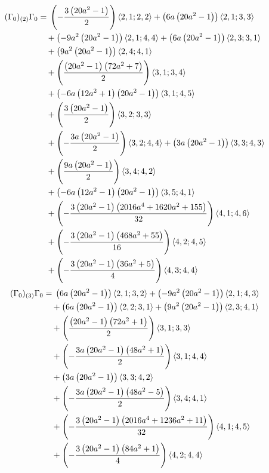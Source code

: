 \begin{align*}
(\Gamma_0)_{(2)}\Gamma_0 &={} \left(- \frac{3 \left(20 a^{2} - 1\right)}{2}\right)\langle 2,1;2,2\rangle + \left(6 a \left(20 a^{2} - 1\right)\right)\langle 2,1;3,3\rangle\\
&\quad {}+ \left(- 9 a^{2} \left(20 a^{2} - 1\right)\right)\langle 2,1;4,4\rangle + \left(6 a \left(20 a^{2} - 1\right)\right)\langle 2,3;3,1\rangle\\
&\quad {}+ \left(9 a^{2} \left(20 a^{2} - 1\right)\right)\langle 2,4;4,1\rangle\\
&\quad {}+ \left(\frac{\left(20 a^{2} - 1\right) \left(72 a^{2} + 7\right)}{2}\right)\langle 3,1;3,4\rangle\\
&\quad {}+ \left(- 6 a \left(12 a^{2} + 1\right) \left(20 a^{2} - 1\right)\right)\langle 3,1;4,5\rangle\\
&\quad {}+ \left(\frac{3 \left(20 a^{2} - 1\right)}{2}\right)\langle 3,2;3,3\rangle\\
&\quad {}+ \left(- \frac{3 a \left(20 a^{2} - 1\right)}{2}\right)\langle 3,2;4,4\rangle + \left(3 a \left(20 a^{2} - 1\right)\right)\langle 3,3;4,3\rangle\\
&\quad {}+ \left(\frac{9 a \left(20 a^{2} - 1\right)}{2}\right)\langle 3,4;4,2\rangle\\
&\quad {}+ \left(- 6 a \left(12 a^{2} - 1\right) \left(20 a^{2} - 1\right)\right)\langle 3,5;4,1\rangle\\
&\quad {}+ \left(- \frac{3 \left(20 a^{2} - 1\right) \left(2016 a^{4} + 1620 a^{2} + 155\right)}{32}\right)\langle 4,1;4,6\rangle\\
&\quad {}+ \left(- \frac{3 \left(20 a^{2} - 1\right) \left(468 a^{2} + 55\right)}{16}\right)\langle 4,2;4,5\rangle\\
&\quad {}+ \left(- \frac{3 \left(20 a^{2} - 1\right) \left(36 a^{2} + 5\right)}{4}\right)\langle 4,3;4,4\rangle
\end{align*}
\begin{align*}
(\Gamma_0)_{(3)}\Gamma_0 &={} \left(6 a \left(20 a^{2} - 1\right)\right)\langle 2,1;3,2\rangle + \left(- 9 a^{2} \left(20 a^{2} - 1\right)\right)\langle 2,1;4,3\rangle\\
&\quad {}+ \left(6 a \left(20 a^{2} - 1\right)\right)\langle 2,2;3,1\rangle + \left(9 a^{2} \left(20 a^{2} - 1\right)\right)\langle 2,3;4,1\rangle\\
&\quad {}+ \left(\frac{\left(20 a^{2} - 1\right) \left(72 a^{2} + 1\right)}{2}\right)\langle 3,1;3,3\rangle\\
&\quad {}+ \left(- \frac{3 a \left(20 a^{2} - 1\right) \left(48 a^{2} + 1\right)}{2}\right)\langle 3,1;4,4\rangle\\
&\quad {}+ \left(3 a \left(20 a^{2} - 1\right)\right)\langle 3,3;4,2\rangle\\
&\quad {}+ \left(- \frac{3 a \left(20 a^{2} - 1\right) \left(48 a^{2} - 5\right)}{2}\right)\langle 3,4;4,1\rangle\\
&\quad {}+ \left(- \frac{3 \left(20 a^{2} - 1\right) \left(2016 a^{4} + 1236 a^{2} + 11\right)}{32}\right)\langle 4,1;4,5\rangle\\
&\quad {}+ \left(- \frac{3 \left(20 a^{2} - 1\right) \left(84 a^{2} + 1\right)}{4}\right)\langle 4,2;4,4\rangle
\end{align*}
